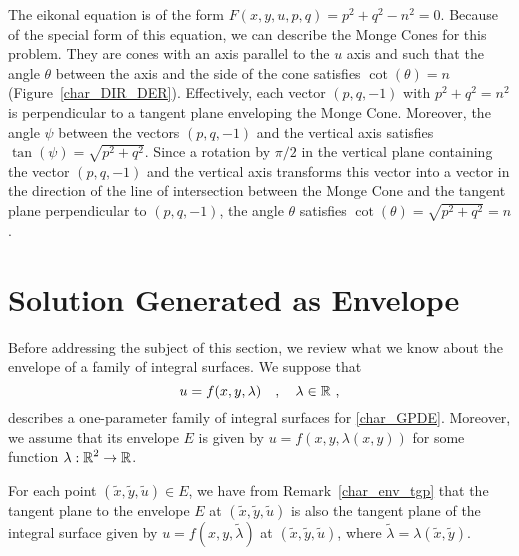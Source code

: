 \begin{rmk}
The eikonal equation is of the form
$\displaystyle F(x,y,u,p,q) = p^2 + q^2 - n^2=0$.  Because of the
special form of this equation, we can describe the Monge Cones for
this problem.  They are cones with an axis parallel to the $u$ axis
and such that the angle $\theta$ between the axis and the side of the
cone satisfies $\cot(\theta)=n$ (Figure~\ref{char_DIR_DER}).
Effectively, each vector $(p,q,-1)$ with $\displaystyle p^2+q^2=n^2$ is
perpendicular to a tangent plane enveloping the Monge Cone.
Moreover, the angle $\psi$ between the vectors $(p,q,-1)$ and the
vertical axis satisfies $\displaystyle \tan(\psi) = \sqrt{p^2+q^2}$.  Since a
rotation by $\pi/2$ in the vertical plane containing the vector
$(p,q,-1)$ and the vertical axis transforms this vector into a vector
in the direction of the line of intersection between the Monge Cone
and the tangent plane perpendicular to $(p,q,-1)$, the angle $\theta$
satisfies $\displaystyle \cot(\theta) = \sqrt{p^2 + q^2} = n$.
\end{rmk}


\section{Solution Generated as Envelope}

Before addressing the subject of this section, we review what we know
about the envelope of a family of integral surfaces.  We suppose that
\[
u = f(x,y,\lambda) \quad , \quad \lambda \in \mathbb{R} \ ,
\]
describes a one-parameter family of integral surfaces for
\ref{char_GPDE}.  Moreover, we assume that its envelope $E$ is given
by $u = f(x,y,\lambda(x,y))$ for some function
$\displaystyle \lambda: \mathbb{R}^2 \to \mathbb{R}$.

For each point
$\displaystyle \left(\tilde{x},\tilde{y},\tilde{u}\right) \in E$, we have from
Remark~\ref{char_env_tgp} that the tangent plane to the envelope $E$
at $\displaystyle \left(\tilde{x},\tilde{y},\tilde{u}\right)$ is also
the tangent plane of the integral surface given by
$u= f(x,y,\tilde{\lambda})$ at 
$\displaystyle \left(\tilde{x},\tilde{y},\tilde{u}\right)$, where
$\displaystyle \tilde{\lambda} = \lambda\left(\tilde{x},\tilde{y}\right)$.

